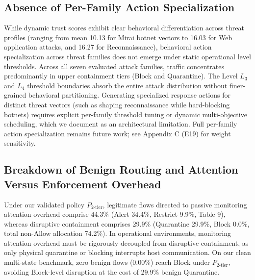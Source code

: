 \documentclass[journal,10pt,onecolumn]{IEEEtran}
\begin{document}
\subsection{Absence of Per-Family Action Specialization}
While dynamic trust scores exhibit clear behavioral differentiation across threat profiles (ranging from mean 10.13 for Mirai botnet vectors to 16.03 for Web application attacks, and 16.27 for Reconnaissance), behavioral action specialization across threat families does not emerge under static operational level thresholds. Across all seven evaluated attack families, traffic concentrates predominantly in upper containment tiers (Block and Quarantine). The Level $L_3$ and $L_4$ threshold boundaries absorb the entire attack distribution without finer-grained behavioral partitioning. Generating specialized response actions for distinct threat vectors (such as shaping reconnaissance while hard-blocking botnets) requires explicit per-family threshold tuning or dynamic multi-objective scheduling, which we document as an architectural limitation. Full per-family action specialization remains future work; see Appendix C (E19) for weight sensitivity.


\subsection{Breakdown of Benign Routing and Attention Versus Enforcement Overhead}
Under our validated policy $P_{2\text{-tier}}$, legitimate flows directed to passive monitoring attention overhead comprise 44.3\% (Alert 34.4\%, Restrict 9.9\%, Table 9), whereas disruptive containment comprises 29.9\% (Quarantine 29.9\%, Block 0.0\%, total non-Allow allocation 74.2\%). In operational environments, monitoring attention overhead must be rigorously decoupled from disruptive containment, as only physical quarantine or blocking interrupts host communication. On our clean multi-state benchmark, zero benign flows (0.00\%) reach Block under $P_{2\text{-tier}}$, avoiding Block-level disruption at the cost of 29.9\% benign Quarantine.
\end{document}
